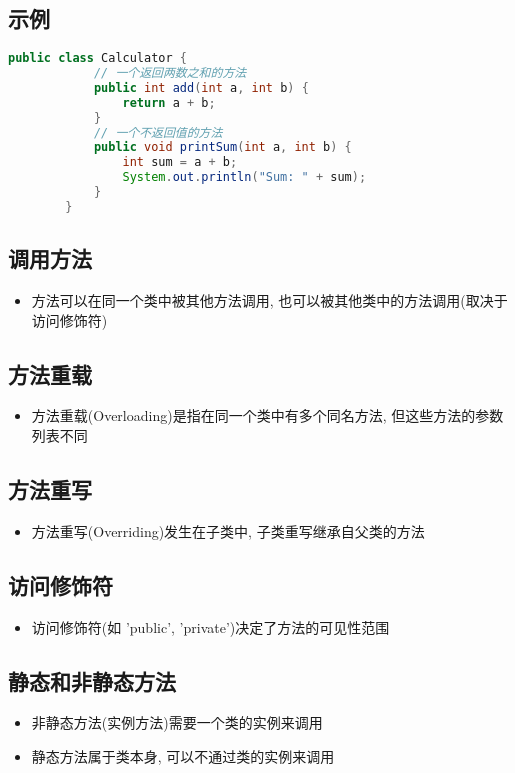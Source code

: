 \documentclass{article}
\begin{document}
\subsection{ 示例}
\begin{tcolorbox}
    \begin{lstlisting}[language = java]
        public class Calculator {
            // 一个返回两数之和的方法
            public int add(int a, int b) {
                return a + b;
            }
            // 一个不返回值的方法
            public void printSum(int a, int b) {
                int sum = a + b;
                System.out.println("Sum: " + sum);
            }
        }
    \end{lstlisting}
\end{tcolorbox}
\subsection{ 调用方法}
\begin{itemize}
    \item 方法可以在同一个类中被其他方法调用, 也可以被其他类中的方法调用(取决于访问修饰符)
\end{itemize}
\subsection{ 方法重载}
\begin{itemize}
    \item 方法重载(Overloading)是指在同一个类中有多个同名方法, 但这些方法的参数列表不同
\end{itemize}
\subsection{ 方法重写}
\begin{itemize}
    \item 方法重写(Overriding)发生在子类中, 子类重写继承自父类的方法
\end{itemize}
\subsection{ 访问修饰符}
\begin{itemize}
    \item 访问修饰符(如 'public', 'private')决定了方法的可见性范围
\end{itemize}
\subsection{ 静态和非静态方法}
\begin{itemize}
    \item 非静态方法(实例方法)需要一个类的实例来调用
    \item 静态方法属于类本身, 可以不通过类的实例来调用
\end{itemize}
\end{document}

